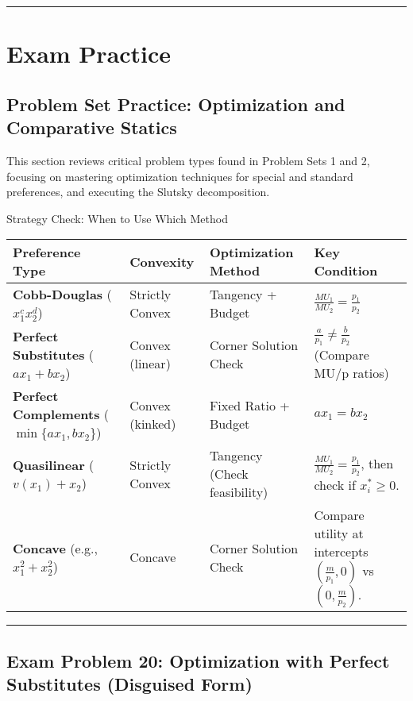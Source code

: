 \documentclass{article}
\begin{document}
\hrule

\section{Exam Practice}
\subsection{Problem Set Practice: Optimization and Comparative Statics}

This section reviews critical problem types found in Problem Sets 1 and 2, focusing on mastering optimization techniques for special and standard preferences, and executing the Slutsky decomposition.

Strategy Check: When to Use Which Method

\begin{center}
\begin{tabular}{llll}
\toprule
Preference Type & Convexity & Optimization Method & Key Condition \\
\midrule
\textbf{Cobb-Douglas} ($x_1^c x_2^d$) & Strictly Convex & Tangency + Budget & $\frac{MU_1}{MU_2} = \frac{p_1}{p_2}$ \\
\textbf{Perfect Substitutes} ($a x_1 + b x_2$) & Convex (linear) & Corner Solution Check & $\frac{a}{p_1} \neq \frac{b}{p_2}$ (Compare MU/p ratios) \\
\textbf{Perfect Complements} ($\min\{a x_1, b x_2\}$) & Convex (kinked) & Fixed Ratio + Budget & $a x_1 = b x_2$ \\
\textbf{Quasilinear} ($v(x_1) + x_2$) & Strictly Convex & Tangency (Check feasibility) & $\frac{MU_1}{MU_2} = \frac{p_1}{p_2}$, then check if $x_i^* \geq 0$. \\
\textbf{Concave} (e.g., $x_1^2+x_2^2$) & Concave & Corner Solution Check & Compare utility at intercepts $\left(\frac{m}{p_1}, 0\right)$ vs $\left(0, \frac{m}{p_2}\right)$. \\
\bottomrule

\end{tabular}

\end{center}

\bigskip\noindent\rule{\linewidth}{0.4pt}\bigskip

\subsection*{\textbf{Exam Problem 20: Optimization with Perfect Substitutes (Disguised Form)}}
\end{document}
